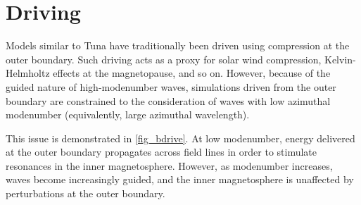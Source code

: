 
\section{Driving}
  \label{sec_driving}


Models similar to Tuna have traditionally been driven using compression at the
outer boundary\cite{lysak_2004,lysak_2013,waters_2013,waters_2008}. Such
driving acts as a proxy for solar wind compression, Kelvin-Helmholtz effects at
the magnetopause, and so on. However, because of the guided nature of
high-modenumber \Alfven waves, simulations driven from the outer boundary are
constrained to the consideration of waves with low azimuthal modenumber
(equivalently, large azimuthal wavelength). 

This issue is demonstrated in \cref{fig_bdrive}. At low modenumber, energy
delivered at the outer boundary propagates across field lines in order to
stimulate resonances in the inner magnetosphere. However, as modenumber
increases, \Alfven waves become increasingly guided, and the inner
magnetosphere is unaffected by perturbations at the outer boundary. 

